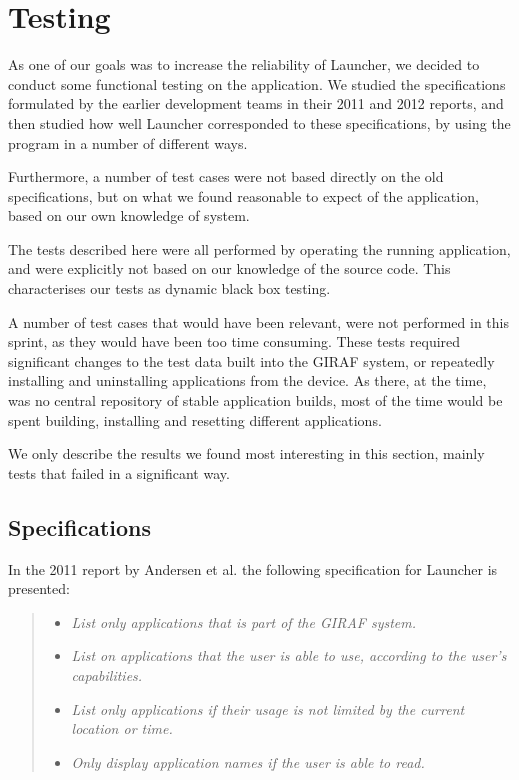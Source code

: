\section{Testing}
\label{sec:testing_sprint1}
As one of our goals was to increase the reliability of Launcher, we decided to conduct some functional testing on the application.
We studied the specifications formulated by the earlier development teams in their 2011 \cite{launcher2011} and 2012 \cite{launcher2012} reports, and then studied how well Launcher corresponded to these specifications, by using the program in a number of different ways. 

Furthermore, a number of test cases were not based directly on the old specifications, but on what we found reasonable to expect of the application, based on our own knowledge of system.

The tests described here were all performed by operating the running application, and were explicitly not based on our knowledge of the source code. This characterises our tests as dynamic black box testing. 

A number of test cases that would have been relevant, were not performed in this sprint, as they would have been too time consuming. These tests required significant changes to the test data built into the GIRAF system, or repeatedly installing and uninstalling applications from the device. As there, at the time, was no central repository of stable application builds, most of the time would be spent building, installing and resetting different applications.

We only describe the results we found most interesting in this section, mainly tests that failed in a significant way. 

\subsection{Specifications}
In the 2011 report by Andersen et al. \cite{launcher2011} the following specification for Launcher is presented:
\begin{quote}
\begin{itemize}
	\item \textit{List only applications that is part of the GIRAF system.}
	\item \textit{List on applications that the user is able to use, according to the user's capabilities.}
	\item \textit{List only applications if their usage is not limited by the current location or time.}
	\item \textit{Only display application names if the user is able to read.}
\end{itemize}
\end{quote}


